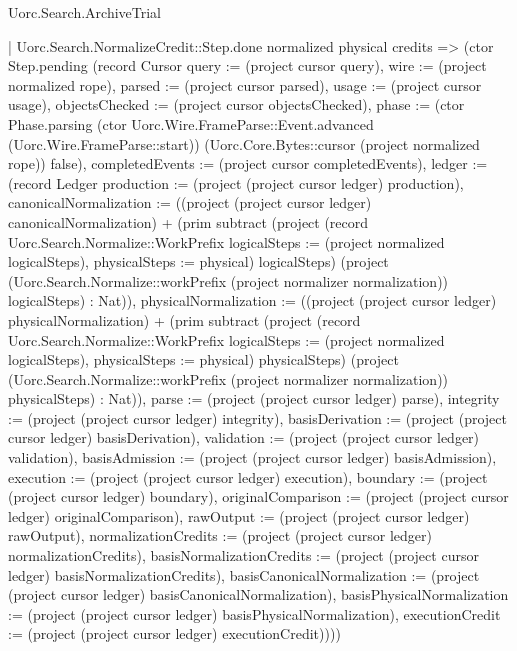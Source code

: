 \begin{lexlean}{Uorc.Search.ArchiveTrial}
\begin{semanticmodule}
{{{          | Uorc.Search.NormalizeCredit::Step.done normalized physical credits => (ctor Step.pending (record Cursor {query := (project cursor query), wire := (project normalized rope), parsed := (project cursor parsed), usage := (project cursor usage), objectsChecked := (project cursor objectsChecked), phase := (ctor Phase.parsing (ctor Uorc.Wire.FrameParse::Event.advanced (Uorc.Wire.FrameParse::start)) (Uorc.Core.Bytes::cursor (project normalized rope)) false), completedEvents := (project cursor completedEvents), ledger := (record Ledger {production := (project (project cursor ledger) production), canonicalNormalization := ((project (project cursor ledger) canonicalNormalization) + (prim subtract (project (record Uorc.Search.Normalize::WorkPrefix {logicalSteps := (project normalized logicalSteps), physicalSteps := physical}) logicalSteps) (project (Uorc.Search.Normalize::workPrefix (project normalizer normalization)) logicalSteps) : Nat)), physicalNormalization := ((project (project cursor ledger) physicalNormalization) + (prim subtract (project (record Uorc.Search.Normalize::WorkPrefix {logicalSteps := (project normalized logicalSteps), physicalSteps := physical}) physicalSteps) (project (Uorc.Search.Normalize::workPrefix (project normalizer normalization)) physicalSteps) : Nat)), parse := (project (project cursor ledger) parse), integrity := (project (project cursor ledger) integrity), basisDerivation := (project (project cursor ledger) basisDerivation), validation := (project (project cursor ledger) validation), basisAdmission := (project (project cursor ledger) basisAdmission), execution := (project (project cursor ledger) execution), boundary := (project (project cursor ledger) boundary), originalComparison := (project (project cursor ledger) originalComparison), rawOutput := (project (project cursor ledger) rawOutput), normalizationCredits := (project (project cursor ledger) normalizationCredits), basisNormalizationCredits := (project (project cursor ledger) basisNormalizationCredits), basisCanonicalNormalization := (project (project cursor ledger) basisCanonicalNormalization), basisPhysicalNormalization := (project (project cursor ledger) basisPhysicalNormalization), executionCredit := (project (project cursor ledger) executionCredit)})}))
}}}
\end{semanticmodule}
\end{lexlean}
